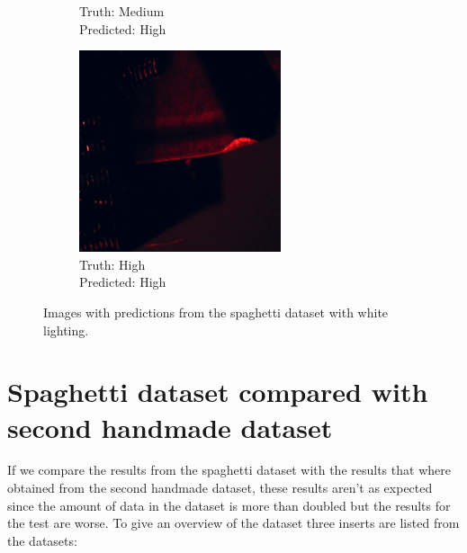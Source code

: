 \begin{figure}[hbtp]
\begin{subfigure}{.24\textwidth}
			\caption{Truth: Medium \\Predicted: High}
			\label{fig:res:sd:testimg:red:error}
		\end{subfigure}
		\hspace*{\fill}
		\begin{subfigure}{.24\textwidth}
			\centering
			\includegraphics[width=\textwidth]{fig/results/wandb/spaghetti_dataset/images/media_images_Examples_r_96_p0_t0.png}
			\caption{Truth: High \\Predicted: High}
		\end{subfigure}
		\caption{Images with predictions from the spaghetti dataset with white lighting.}
		\label{fig:res:sd:testimg:red}
	\end{figure}


\section{Spaghetti dataset compared with second handmade dataset}
If we compare the results from the spaghetti dataset with the results that where obtained from the second handmade dataset, these results aren't as expected since the amount of data in the dataset is more than doubled but the results for the test are worse. To give an overview of the dataset three inserts are listed from the datasets:

